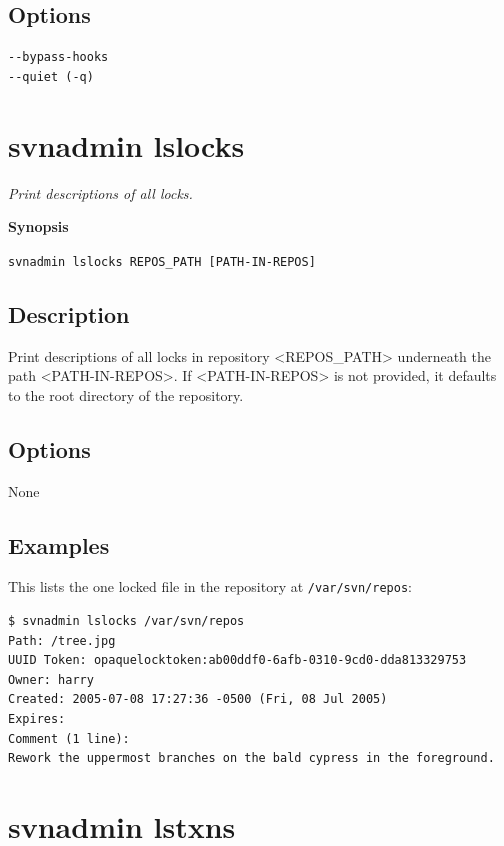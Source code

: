 \subsection{Options}

\begin{verbatim}
--bypass-hooks
--quiet (-q)
\end{verbatim}

\section{svnadmin lslocks}\label{svn.ref.svnadmin.c.lslocks}

\emph{Print descriptions of all locks.}

\textbf{Synopsis}

\texttt{svnadmin\ lslocks\ REPOS\_PATH\ {[}PATH-IN-REPOS{]}}

\subsection{Description}

Print descriptions of all locks in repository
\textless REPOS\_PATH\textgreater{} underneath the path
\textless PATH-IN-REPOS\textgreater. If
\textless PATH-IN-REPOS\textgreater{} is not provided, it defaults to
the root directory of the repository.

\subsection{Options}

None

\subsection{Examples}

This lists the one locked file in the repository at
\texttt{/var/svn/repos}:

\begin{verbatim}
$ svnadmin lslocks /var/svn/repos
Path: /tree.jpg
UUID Token: opaquelocktoken:ab00ddf0-6afb-0310-9cd0-dda813329753
Owner: harry
Created: 2005-07-08 17:27:36 -0500 (Fri, 08 Jul 2005)
Expires: 
Comment (1 line):
Rework the uppermost branches on the bald cypress in the foreground.
\end{verbatim}

\section{svnadmin lstxns}\label{svn.ref.svnadmin.c.lstxns}

